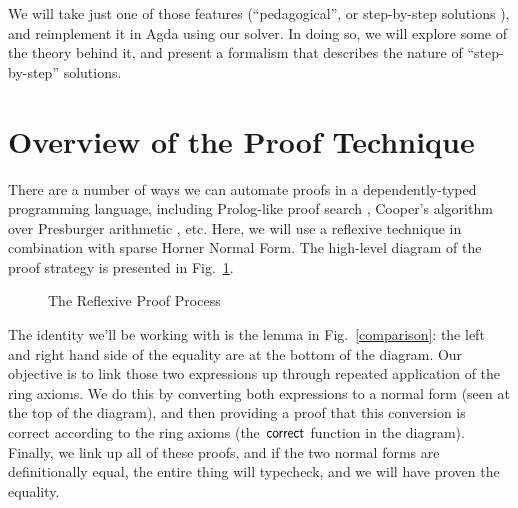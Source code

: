 \documentclass[acmsmall,review,anonymous]{acmart}\settopmatter{printfolios=true,printccs=false,printacmref=false}
\begin{document}
\begin{description}
    We will take just one of those features (``pedagogical'', or step-by-step
    solutions \cite{the_development_team_step-by-step_2009}), and reimplement it
    in Agda using our solver. In doing so, we will explore some of the theory
    behind it, and present a formalism that describes the nature of
    ``step-by-step'' solutions.
\end{description}

\section{Overview of the Proof Technique}
There are a number of ways we can automate proofs in a dependently-typed
programming language, including Prolog-like proof search \cite{kokke_auto_2015},
Cooper's algorithm over Presburger arithmetic \cite{allais_deciding_2011}, etc.
Here, we will use a reflexive technique \cite{boutin_using_1997} in combination
with sparse Horner Normal Form. The high-level diagram of the proof strategy is
presented in Fig.~\ref{proof-process}.

\begin{figure}
  \vspace*{-50pt}
  \caption{The Reflexive Proof Process}
  \label{proof-process}
\end{figure}

The identity we'll be working with is the lemma in Fig.~\ref{comparison}: the
left and right hand side of the equality are at the bottom of the diagram. Our
objective is to link those two expressions up through repeated application of
the ring axioms. We do this by converting both expressions to a normal form
(seen at the top of the diagram), and then providing a proof that this
conversion is correct according to the ring axioms (the
\(\AgdaFunction{correct}\) function in the diagram). Finally, we link up all of
these proofs, and if the two normal forms are definitionally equal, the entire
thing will typecheck, and we will have proven the equality.
\end{document}
